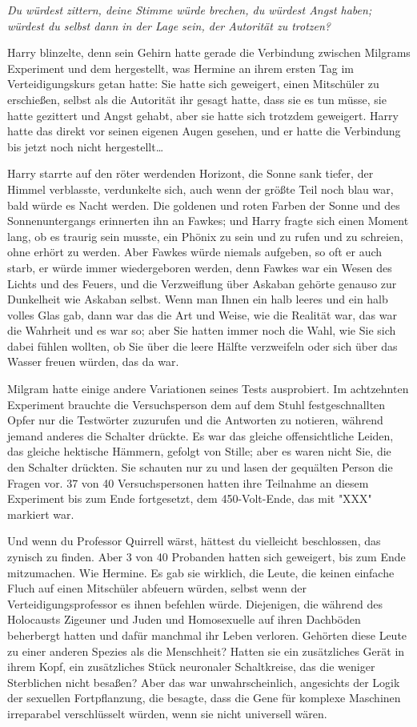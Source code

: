 {\emph{Du würdest zittern, deine Stimme würde brechen, du würdest Angst haben; würdest du selbst dann in der Lage sein, der Autorität zu trotzen?}

Harry blinzelte, denn sein Gehirn hatte gerade die Verbindung zwischen Milgrams Experiment und dem hergestellt, was Hermine an ihrem ersten Tag im Verteidigungskurs getan hatte: Sie hatte sich geweigert, einen Mitschüler zu erschießen, selbst als die Autorität ihr gesagt hatte, dass sie es tun müsse, sie hatte gezittert und Angst gehabt, aber sie hatte sich trotzdem geweigert. Harry hatte das direkt vor seinen eigenen Augen gesehen, und er hatte die Verbindung bis jetzt noch nicht hergestellt…

Harry starrte auf den röter werdenden Horizont, die Sonne sank tiefer, der Himmel verblasste, verdunkelte sich, auch wenn der größte Teil noch blau war, bald würde es Nacht werden. Die goldenen und roten Farben der Sonne und des Sonnenuntergangs erinnerten ihn an Fawkes; und Harry fragte sich einen Moment lang, ob es traurig sein musste, ein Phönix zu sein und zu rufen und zu schreien, ohne erhört zu werden. Aber Fawkes würde niemals aufgeben, so oft er auch starb, er würde immer wiedergeboren werden, denn Fawkes war ein Wesen des Lichts und des Feuers, und die Verzweiflung über Askaban gehörte genauso zur Dunkelheit wie Askaban selbst. Wenn man Ihnen ein halb leeres und ein halb volles Glas gab, dann war das die Art und Weise, wie die Realität war, das war die Wahrheit und es war so; aber Sie hatten immer noch die Wahl, wie Sie sich dabei fühlen wollten, ob Sie über die leere Hälfte verzweifeln oder sich über das Wasser freuen würden, das da war.

Milgram hatte einige andere Variationen seines Tests ausprobiert. Im achtzehnten Experiment brauchte die Versuchsperson dem auf dem Stuhl festgeschnallten Opfer nur die Testwörter zuzurufen und die Antworten zu notieren, während jemand anderes die Schalter drückte. Es war das gleiche offensichtliche Leiden, das gleiche hektische Hämmern, gefolgt von Stille; aber es waren nicht Sie, die den Schalter drückten. Sie schauten nur zu und lasen der gequälten Person die Fragen vor. 37 von 40 Versuchspersonen hatten ihre Teilnahme an diesem Experiment bis zum Ende fortgesetzt, dem 450-Volt-Ende, das mit "XXX" markiert war.

Und wenn du Professor Quirrell wärst, hättest du vielleicht beschlossen, das zynisch zu finden. Aber 3 von 40 Probanden hatten sich geweigert, bis zum Ende mitzumachen. Wie Hermine. Es gab sie wirklich, die Leute, die keinen einfache Fluch auf einen Mitschüler abfeuern würden, selbst wenn der Verteidigungsprofessor es ihnen befehlen würde. Diejenigen, die während des Holocausts Zigeuner und Juden und Homosexuelle auf ihren Dachböden beherbergt hatten und dafür manchmal ihr Leben verloren. Gehörten diese Leute zu einer anderen Spezies als die Menschheit? Hatten sie ein zusätzliches Gerät in ihrem Kopf, ein zusätzliches Stück neuronaler Schaltkreise, das die weniger Sterblichen nicht besaßen? Aber das war unwahrscheinlich, angesichts der Logik der sexuellen Fortpflanzung, die besagte, dass die Gene für komplexe Maschinen irreparabel verschlüsselt würden, wenn sie nicht universell wären.

}
